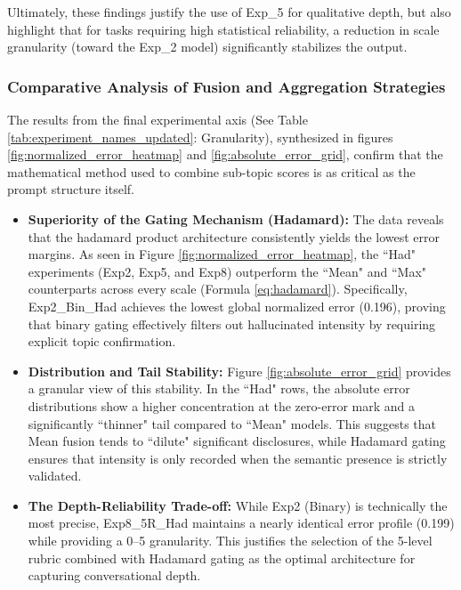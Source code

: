 Ultimately, these findings justify the use of Exp\_5 for qualitative depth, but also highlight that for tasks requiring high statistical reliability, a reduction in scale granularity (toward the Exp\_2 model) significantly stabilizes the output.



\newpage
\subsubsection{Comparative Analysis of Fusion and Aggregation Strategies}

The results from the final experimental axis (See Table \ref{tab:experiment_names_updated}: Granularity), synthesized in figures \ref{fig:normalized_error_heatmap} and \ref{fig:absolute_error_grid}, confirm that the mathematical method used to combine sub-topic scores is as critical as the prompt structure itself. 

\begin{itemize}
    \item \textbf{Superiority of the Gating Mechanism (Hadamard):} The data reveals that the \gls{hadamard} product architecture consistently yields the lowest error margins. As seen in Figure \ref{fig:normalized_error_heatmap}, the ``Had" experiments (Exp2, Exp5, and Exp8) outperform the ``Mean" and ``Max" counterparts across every scale (Formula \ref{eq:hadamard}). Specifically, Exp2\_Bin\_Had achieves the lowest global normalized error (0.196), proving that binary gating effectively filters out hallucinated intensity by requiring explicit topic confirmation.
    \item \textbf{Distribution and Tail Stability:} Figure \ref{fig:absolute_error_grid} provides a granular view of this stability. In the ``Had" rows, the absolute error distributions show a higher concentration at the zero-error mark and a significantly ``thinner" tail compared to ``Mean" models. This suggests that Mean fusion tends to ``dilute" significant disclosures, while Hadamard gating ensures that intensity is only recorded when the semantic presence is strictly validated.
    \item \textbf{The Depth-Reliability Trade-off:} While Exp2 (Binary) is technically the most precise, Exp8\_5R\_Had maintains a nearly identical error profile (0.199) while providing a 0--5 granularity. This justifies the selection of the 5-level rubric combined with Hadamard gating as the optimal architecture for capturing conversational depth.
\end{itemize}


